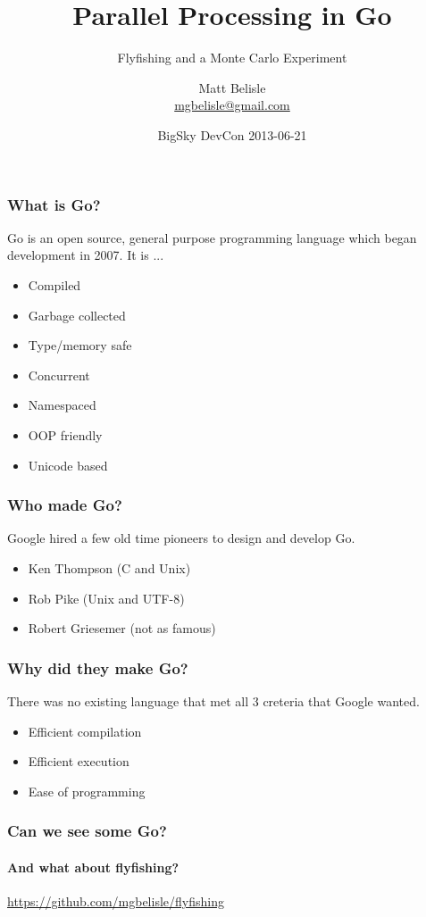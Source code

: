 \documentclass{beamer}
\title{Parallel Processing in Go}
\subtitle{Flyfishing and a Monte Carlo Experiment}
\author{Matt Belisle\\\href{mailto:mgbelisle@gmail.com}{mgbelisle@gmail.com}}
\date{BigSky DevCon 2013-06-21}
\begin{document}
\begin{frame}
  \titlepage
\end{frame}
\begin{frame}
  \frametitle{What is Go?}

  Go is an open source, general purpose programming language which
  began development in 2007.  It is ...
  
  \begin{itemize}
    \item Compiled
    \item Garbage collected
    \item Type/memory safe
    \item Concurrent
    \item Namespaced
    \item OOP friendly
    \item Unicode based
  \end{itemize}
\end{frame}
\begin{frame}
  \frametitle{Who made Go?}

  Google hired a few old time pioneers to design and develop Go.
  
  \begin{itemize}
    \item Ken Thompson (C and Unix)
    \item Rob Pike (Unix and UTF-8)
    \item Robert Griesemer (not as famous)
  \end{itemize}
\end{frame}
\begin{frame}
  \frametitle{Why did they make Go?}

  There was no existing language that met all 3 creteria that Google
  wanted.
  
  \begin{itemize}
    \item Efficient compilation
    \item Efficient execution
    \item Ease of programming
  \end{itemize}
\end{frame}
\begin{frame}
  \frametitle{Can we see some Go?}
  \framesubtitle{And what about flyfishing?}
  \begin{center}
    \url{https://github.com/mgbelisle/flyfishing}
  \end{center}
\end{frame}
\end{document}
